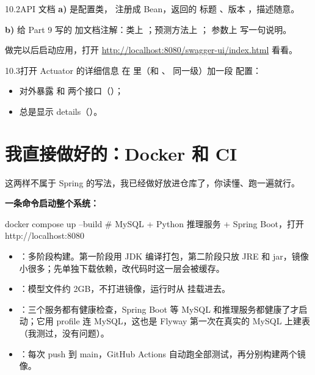 \begin{task}{10.2\quad API 文档}
\textbf{a)}  是配置类， 注册成 Bean，返回的  标题 、版本 ，描述随意。

\textbf{b)} 给 Part 9 写的  加文档注解：类上 ；预测方法上 ； 参数上  写一句说明。

做完以后启动应用，打开 \url{http://localhost:8080/swagger-ui/index.html} 看看。
\end{task}

\begin{task}{10.3\quad 打开 Actuator 的详细信息}
在  里（和 、 同一级）加一段  配置：
\begin{itemize}
  \item 对外暴露  和  两个接口（）；
  \item {} 总是显示 details（）。
\end{itemize}
\end{task}

\section{我直接做好的：Docker 和 CI}

这两样不属于 Spring 的写法，我已经做好放进仓库了，你读懂、跑一遍就行。

\textbf{一条命令启动整个系统：}

\begin{shell}
docker compose up --build        # MySQL + Python 推理服务 + Spring Boot，打开 http://localhost:8080
\end{shell}

\begin{itemize}
  \item {}：多阶段构建。第一阶段用 JDK 编译打包，第二阶段只放 JRE 和 jar，镜像小很多；先单独下载依赖，改代码时这一层会被缓存。
  \item {}：模型文件约 2GB，不打进镜像，运行时从  挂载进去。
  \item {}：三个服务都有健康检查，Spring Boot 等 MySQL 和推理服务都健康了才启动；它用  profile 连 MySQL，这也是 Flyway 第一次在真实的 MySQL 上建表（我测过，没有问题）。
  \item {}：每次 push 到 main，GitHub Actions 自动跑全部测试，再分别构建两个镜像。
\end{itemize}

